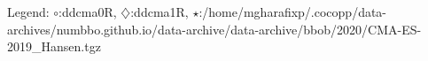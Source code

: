 Legend: {\color{NavyBlue}$\circ$}:ddcma0R, {\color{Magenta}$\diamondsuit$}:ddcma1R, {\color{Orange}$\star$}:/home/mgharafixp/.cocopp/data-archives/numbbo.github.io/data-archive/data-archive/bbob/2020/CMA-ES-2019\_Hansen.tgz